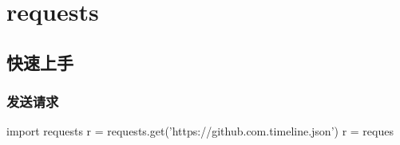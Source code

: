\chapter{requests}
\section{快速上手}
\subsection{发送请求}
\begin{python}
import requests
r = requests.get('https://github.com.timeline.json')
r = reques
\end{python}

